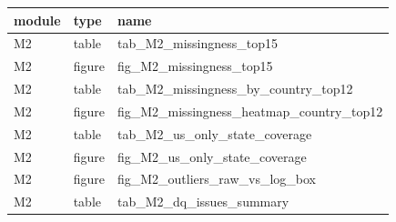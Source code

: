 \begin{tabular}{lll}
\toprule
module & type & name \\
\midrule
M2 & table & tab\_M2\_missingness\_top15 \\
M2 & figure & fig\_M2\_missingness\_top15 \\
M2 & table & tab\_M2\_missingness\_by\_country\_top12 \\
M2 & figure & fig\_M2\_missingness\_heatmap\_country\_top12 \\
M2 & table & tab\_M2\_us\_only\_state\_coverage \\
M2 & figure & fig\_M2\_us\_only\_state\_coverage \\
M2 & figure & fig\_M2\_outliers\_raw\_vs\_log\_box \\
M2 & table & tab\_M2\_dq\_issues\_summary \\
\bottomrule
\end{tabular}
